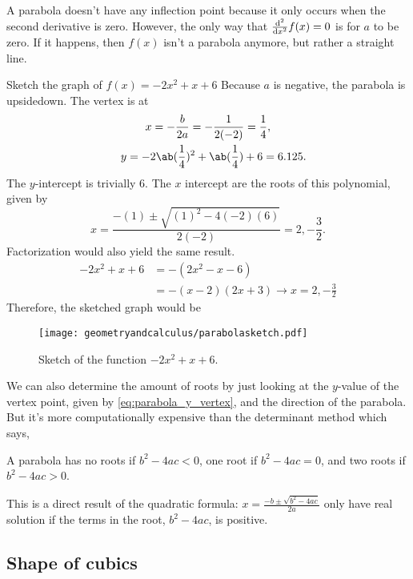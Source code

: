 A parabola doesn't have any inflection point because it only occurs when the second derivative is zero. However, the only way that $\odv*[ord = 2]{f(x)}{x} = 0$ is for $a$ to be zero. If it happens, then $f(x)$ isn't a parabola anymore, but rather a straight line.

\begin{exmp}{Sketch the graph of $f(x) = - 2x^2 + x + 6$}{}
	Because $a$ is negative, the parabola is upsidedown. The vertex is at
	\begin{gather}
		x = -\frac{b}{2a} = -\frac{1}{2(-2)} = \frac{1}{4}, \\
		\quad y = -2\ab(\frac{1}{4})^2 + \ab(\frac{1}{4}) + 6 = 6.125.
	\end{gather}
	The $y$-intercept is trivially $6$. The $x$ intercept are the roots of this polynomial, given by
	\begin{equation}
		x = \frac{-(1) \pm \sqrt{(1)^2 - 4(-2)(6)}}{2(-2)} = 2, -\frac{3}{2}.
	\end{equation}
	Factorization would also yield the same result.
	\begin{align}
		-2x^2 + x + 6 &= -(2x^2 - x - 6) \\
					  &= -(x - 2)(2x + 3) \rightarrow x = 2, -\frac{3}{2}
	\end{align}
	Therefore, the sketched graph would be
	\begin{figure}[H]
		\centering
		\texttt{[image: geometryandcalculus/parabolasketch.pdf]}
		\caption{Sketch of the function $-2x^2 + x + 6$.}
	\end{figure}
\end{exmp}

We can also determine the amount of roots by just looking at the $y$-value of the vertex point, given by \cref{eq:parabola_y_vertex}, and the direction of the parabola. But it's more computationally expensive than the determinant method which says,
\begin{displayquote}
	A parabola has no roots if $b^2 - 4ac < 0$, one root if $b^2 - 4ac = 0$, and two roots if $b^2 - 4ac > 0$.
\end{displayquote}
This is a direct result of the quadratic formula: $x = \frac{- b \pm \sqrt{b^2 - 4ac}}{2a}$ only have real solution if the terms in the root, $b^2 - 4ac$, is positive.

\subsection{Shape of cubics}

